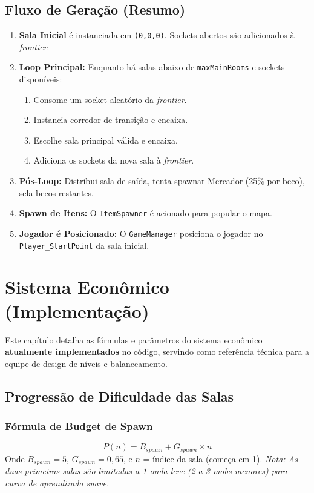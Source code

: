 \documentclass[a4paper,12pt]{report}
\begin{document}
\section{Fluxo de Geração (Resumo)}
\begin{enumerate}
    \item \textbf{Sala Inicial} é instanciada em \texttt{(0,0,0)}. Sockets abertos são adicionados à \textit{frontier}.
    \item \textbf{Loop Principal:} Enquanto há salas abaixo de \texttt{maxMainRooms} e sockets disponíveis:
    \begin{enumerate}
        \item Consome um socket aleatório da \textit{frontier}.
        \item Instancia corredor de transição e encaixa.
        \item Escolhe sala principal válida e encaixa.
        \item Adiciona os sockets da nova sala à \textit{frontier}.
    \end{enumerate}
    \item \textbf{Pós-Loop:} Distribui sala de saída, tenta spawnar Mercador (25\% por beco), sela becos restantes.
    \item \textbf{Spawn de Itens:} O \texttt{ItemSpawner} é acionado para popular o mapa.
    \item \textbf{Jogador é Posicionado:} O \texttt{GameManager} posiciona o jogador no \texttt{Player\_StartPoint} da sala inicial.
\end{enumerate}

\chapter{Sistema Econômico (Implementação)}\label{cap:economia}

Este capítulo detalha as fórmulas e parâmetros do sistema econômico \textbf{atualmente implementados} no código, servindo como referência técnica para a equipe de design de níveis e balanceamento.

\section{Progressão de Dificuldade das Salas}

\subsection{Fórmula de Budget de Spawn}
\[
P(n) = B_{spawn} + G_{spawn} \times n
\]
Onde $B_{spawn} = 5$, $G_{spawn} = 0{,}65$, e $n$ = índice da sala (começa em 1).
\textit{Nota: As duas primeiras salas são limitadas a 1 onda leve (2 a 3 mobs menores) para curva de aprendizado suave.}
\end{document}
